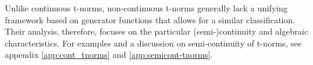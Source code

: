 Unlike continuous t-norms, non-continuous t-norms generally lack a unifying framework based on generator functions that allows for a similar classification. Their analysis, therefore, focuses on the particular (semi-)continuity and algebraic characteristics. For examples and a discussion on semi-continuity of t-norms, see appendix \ref{app:cont_tnorms} and \ref{app:semicont-tnorms}.










































